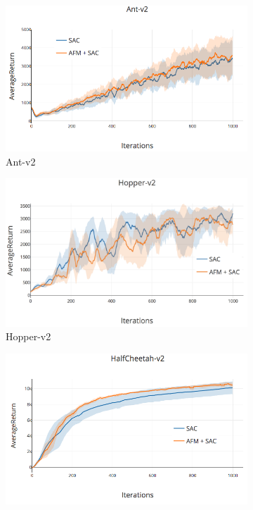 \begin{figure}[t]
\begin{subfigure}[t]{0.33\textwidth}
    \includegraphics[scale=0.24]{images/ant_sac.png}
    \caption{Ant-v2}
\end{subfigure}
\begin{subfigure}[t]{0.33\textwidth}
    \includegraphics[scale=0.24]{images/hopper_sac.png}
    \caption{Hopper-v2}
\end{subfigure}
\begin{subfigure}[t]{0.33\textwidth}
    \includegraphics[scale=0.24]{images/cheetah_sac.png}

\end{subfigure}
\end{figure}
